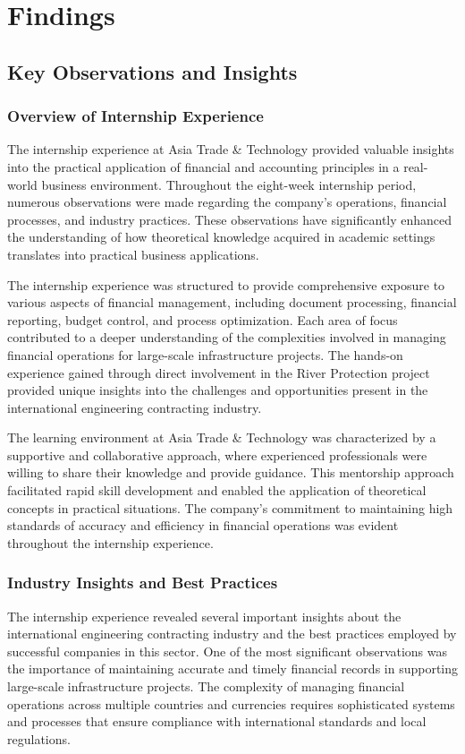 
\chapter{Findings}

\section{Key Observations and Insights}

\subsection{Overview of Internship Experience}
The internship experience at Asia Trade \& Technology provided valuable insights into the practical application of financial and accounting principles in a real-world business environment. Throughout the eight-week internship period, numerous observations were made regarding the company's operations, financial processes, and industry practices. These observations have significantly enhanced the understanding of how theoretical knowledge acquired in academic settings translates into practical business applications.

The internship experience was structured to provide comprehensive exposure to various aspects of financial management, including document processing, financial reporting, budget control, and process optimization. Each area of focus contributed to a deeper understanding of the complexities involved in managing financial operations for large-scale infrastructure projects. The hands-on experience gained through direct involvement in the River Protection project provided unique insights into the challenges and opportunities present in the international engineering contracting industry.

The learning environment at Asia Trade \& Technology was characterized by a supportive and collaborative approach, where experienced professionals were willing to share their knowledge and provide guidance. This mentorship approach facilitated rapid skill development and enabled the application of theoretical concepts in practical situations. The company's commitment to maintaining high standards of accuracy and efficiency in financial operations was evident throughout the internship experience.

\subsection{Industry Insights and Best Practices}
The internship experience revealed several important insights about the international engineering contracting industry and the best practices employed by successful companies in this sector. One of the most significant observations was the importance of maintaining accurate and timely financial records in supporting large-scale infrastructure projects. The complexity of managing financial operations across multiple countries and currencies requires sophisticated systems and processes that ensure compliance with international standards and local regulations.

